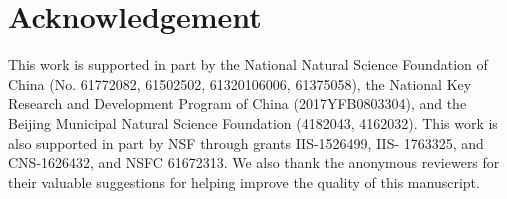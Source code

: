 \documentclass[sigconf]{acmart}
\begin{document}
\maketitle








\section{Acknowledgement}
This work is supported in part by the National Natural Science Foundation of China (No. 61772082, 61502502, 61320106006, 61375058), the National Key Research and Development Program of China (2017YFB0803304), and the Beijing Municipal Natural Science Foundation (4182043, 4162032). This work is also supported in part by NSF through grants IIS-1526499, IIS- 1763325, and CNS-1626432, and NSFC 61672313. 
We also thank the anonymous reviewers for their valuable suggestions for helping improve the quality of this manuscript.



\end{document}
